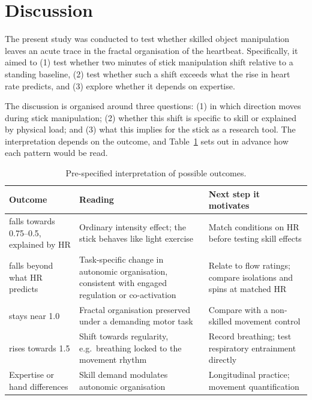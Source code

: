 \section{Discussion}
\label{sec:discussion}

The present study was conducted to test whether skilled object manipulation leaves an acute trace in the fractal organisation of the heartbeat. Specifically, it aimed to (1) test whether two minutes of stick manipulation shift \al{} relative to a standing baseline, (2) test whether such a shift exceeds what the rise in heart rate predicts, and (3) explore whether it depends on expertise. 

The discussion is organised around three questions: (1) in which direction \al{} moves during stick manipulation; (2) whether this shift is specific to skill or explained by physical load; and (3) what this implies for the stick as a research tool. The interpretation depends on the outcome, and Table~\ref{tab:outcomes} sets out in advance how each pattern would be read.

\begin{table}[ht]
\centering
\caption{Pre-specified interpretation of possible outcomes.}
\label{tab:outcomes}
\small
\begin{tabularx}{\textwidth}{>{\raggedright\arraybackslash}p{3.6cm} X X}
\toprule
Outcome & Reading & Next step it motivates \\
\midrule
\al{} falls towards 0.75--0.5, explained by HR & Ordinary intensity effect; the stick behaves like light exercise & Match conditions on HR before testing skill effects \\
\al{} falls beyond what HR predicts & Task-specific change in autonomic organisation, consistent with engaged regulation or co-activation \citep{peifer2014} & Relate to flow ratings; compare isolations and spins at matched HR \\
\al{} stays near 1.0 & Fractal organisation preserved under a demanding motor task & Compare with a non-skilled movement control \\
\al{} rises towards 1.5 & Shift towards regularity, e.g.\ breathing locked to the movement rhythm & Record breathing; test respiratory entrainment directly \\
Expertise or hand differences & Skill demand modulates autonomic organisation & Longitudinal practice; movement quantification \\
\bottomrule
\end{tabularx}
\end{table}

